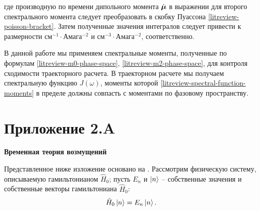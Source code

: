 %
где производную по времени дипольного момента $\dot{\boldsymbol{\mu}}$ в выражении для второго спектрального момента следует преобразовать в скобку Пуассона \eqref{litreview-poisson-bracket}. Затем полученные значения интегралов следует привести к размерности см$^{-1} \cdot$Амага$^{-2}$ и  см$^{-3} \cdot$Амага$^{-2}$, соответственно. \par
В данной работе мы применяем спектральные моменты, полученные по формулам \eqref{litreview-m0-phase-space}, \eqref{litreview-m2-phase-space}, для контроля сходимости траекторного расчета. В траекторном расчете мы получаем спектральную функцию $J(\omega)$, моменты которой \eqref{litreview-spectral-function-moments} в пределе должны совпасть с моментами по фазовому пространству.

\chapter*{Приложение 2.A}
{\Large\textbf{Временная теория возмущений}} \label{appendix:perturbation-theory}
\vspace{0.5cm}

Представленное ниже изложение основано на \cite{cohentanuji}. Рассмотрим физическую систему, описываемую гамильтонианом $\hat{H}_0$; пусть $E_n$ и $\ket{n}$ -- собственные значения и собственные векторы гамильтониана $\hat{H}_0$:
\begin{gather}
    \hat{H}_0 \ket{n} = E_n \ket{n}.
\end{gather}

